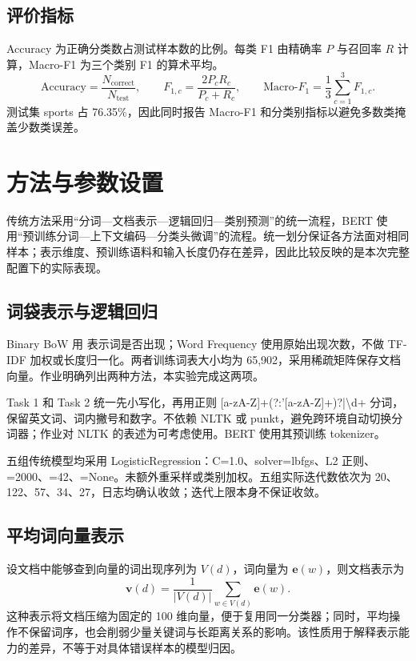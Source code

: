 \documentclass[UTF8,12pt,a4paper,fontset=fandol]{ctexart}
\begin{document}
\subsection{评价指标}
Accuracy 为正确分类数占测试样本数的比例。每类 F1 由精确率 $P$ 与召回率 $R$ 计算，Macro-F1 为三个类别 F1 的算术平均。
\begin{equation}
\mathrm{Accuracy}=\frac{N_{\mathrm{correct}}}{N_{\mathrm{test}}},\qquad F_{1,c}=\frac{2P_cR_c}{P_c+R_c},\qquad \mathrm{Macro}\text{-}F_1=\frac{1}{3}\sum_{c=1}^{3}F_{1,c}.
\end{equation}
测试集 sports 占 76.35\%，因此同时报告 Macro-F1 和分类别指标以避免多数类掩盖少数类误差。

\FloatBarrier
\section{方法与参数设置}
传统方法采用“分词—文档表示—逻辑回归—类别预测”的统一流程，BERT 使用“预训练分词—上下文编码—分类头微调”的流程。统一划分保证各方法面对相同样本；表示维度、预训练语料和输入长度仍存在差异，因此比较反映的是本次完整配置下的实际表现。

\subsection{词袋表示与逻辑回归}
Binary BoW 用  表示词是否出现；Word Frequency 使用原始出现次数，不做 TF-IDF 加权或长度归一化。两者训练词表大小均为 65,902，采用稀疏矩阵保存文档向量。作业明确列出两种方法，本实验完成这两项。

Task 1 和 Task 2 统一先小写化，再用正则 [a-zA-Z]+(?:'[a-zA-Z]+)?|\textbackslash{}d+ 分词，保留英文词、词内撇号和数字。不依赖 NLTK 或 punkt，避免跨环境自动切换分词器；作业对 NLTK 的表述为可考虑使用。BERT 使用其预训练 tokenizer。

五组传统模型均采用 LogisticRegression：C=1.0、solver=lbfgs、L2 正则、=2000、=42、=None。未额外重采样或类别加权。五组实际迭代数依次为 20、122、57、34、27，日志均确认收敛；迭代上限本身不保证收敛。

\subsection{平均词向量表示}
设文档中能够查到向量的词出现序列为 $V(d)$，词向量为 $\mathbf{e}(w)$，则文档表示为
\begin{equation}
\mathbf{v}(d)=\frac{1}{|V(d)|}\sum_{w\in V(d)}\mathbf{e}(w).
\end{equation}
这种表示将文档压缩为固定的 100 维向量，便于复用同一分类器；同时，平均操作不保留词序，也会削弱少量关键词与长距离关系的影响。该性质用于解释表示能力的差异，不等于对具体错误样本的模型归因。
\end{document}
